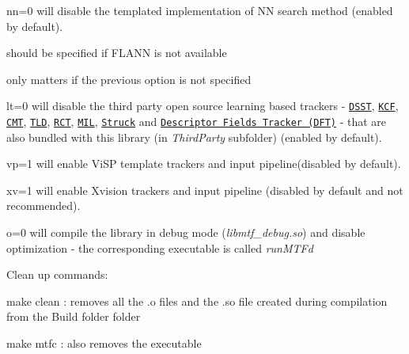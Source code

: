 \begin{DoxyItemize}
\begin{DoxyItemize}
\begin{DoxyItemize}
\begin{DoxyItemize}
\end{DoxyItemize}
\item {\ttfamily nn=0} will disable the templated implementation of N\-N search method (enabled by default).
\begin{DoxyItemize}
\item should be specified if F\-L\-A\-N\-N is not available
\item only matters if the previous option is not specified
\end{DoxyItemize}
\item {\ttfamily lt=0} will disable the third party open source learning based trackers -\/ \href{http://www.cvl.isy.liu.se/en/research/objrec/visualtracking/scalvistrack/index.html}{\tt D\-S\-S\-T}, \href{http://home.isr.uc.pt/~henriques/circulant/}{\tt K\-C\-F}, \href{http://www.gnebehay.com/cmt/}{\tt C\-M\-T}, \href{http://www.gnebehay.com/tld/}{\tt T\-L\-D}, \href{http://www4.comp.polyu.edu.hk/~cslzhang/CT/CT.htm}{\tt R\-C\-T}, \href{http://ieeexplore.ieee.org/xpl/login.jsp?tp=&arnumber=5206737&url=http%3A%2F%2Fieeexplore.ieee.org%2Fxpls%2Fabs_all.jsp%3Farnumber%3D5206737}{\tt M\-I\-L}, \href{http://www.samhare.net/research/struck, [Fragments based tracker](http://www.cs.technion.ac.il/~amita/fragtrack/fragtrack.htm}{\tt Struck} and \href{http://cvlab.epfl.ch/page-107683-en.html}{\tt Descriptor Fields Tracker (D\-F\-T)} -\/ that are also bundled with this library (in {\itshape Third\-Party} subfolder) (enabled by default).
\item {\ttfamily vp=1} will enable Vi\-S\-P template trackers and input pipeline(disabled by default).
\item {\ttfamily xv=1} will enable Xvision trackers and input pipeline (disabled by default and not recommended).
\item {\ttfamily o=0} will compile the library in debug mode ({\itshape libmtf\-\_\-debug.\-so}) and disable optimization -\/ the corresponding executable is called {\itshape run\-M\-T\-Fd}
\end{DoxyItemize}
\item Clean up commands\-:
\begin{DoxyItemize}
\item {\ttfamily make clean} \-: removes all the .o files and the .so file created during compilation from the Build folder folder
\item {\ttfamily make mtfc} \-: also removes the executable
\end{DoxyItemize}
\end{DoxyItemize}
\end{DoxyItemize}

